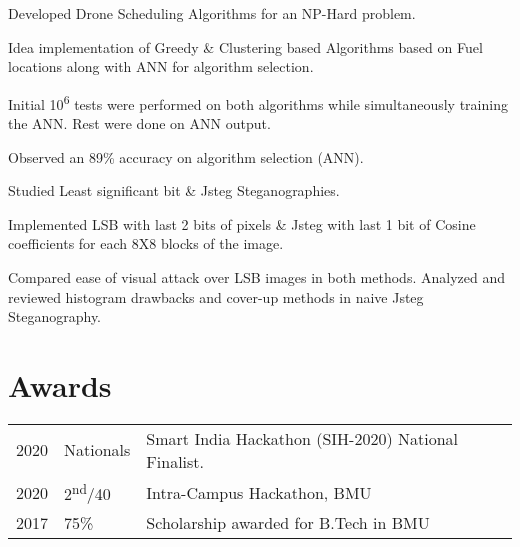 \documentclass[]{deedy-resume-openfont}
\begin{document}
\begin{minipage}[t]{0.66\textwidth}
\begin{tightemize}
\item Developed Drone Scheduling Algorithms for an NP-Hard problem.
\item Idea implementation of Greedy \& Clustering based Algorithms based on Fuel locations along with ANN for algorithm selection.
\item Initial 10\textsuperscript{6} tests were performed on both algorithms while simultaneously training the ANN. Rest were done on ANN output.
\item Observed an 89\% accuracy on algorithm selection (ANN).
\end{tightemize}  

\begin{tightemize}
\item Studied Least significant bit \& Jsteg Steganographies.
\item Implemented LSB with last 2 bits of pixels \& Jsteg with last 1 bit of Cosine coefficients for each 8X8 blocks of the image.
\item Compared ease of visual attack over LSB images in both methods. Analyzed and reviewed histogram drawbacks and cover-up methods in naive Jsteg Steganography.   
\end{tightemize}  


\sectionsep


\section{Awards} 
\begin{tabular}{rll}
2020	     & Nationals & Smart India Hackathon (SIH-2020) National Finalist.\\
2020	     & 2\textsuperscript{nd}/40  & Intra-Campus Hackathon, BMU \\
2017	     & 75\%  & Scholarship awarded for B.Tech in BMU \\
\end{tabular}
\sectionsep

\end{minipage} 
\end{document}

